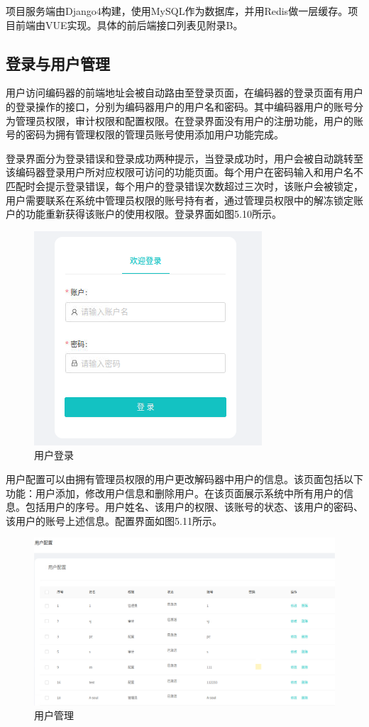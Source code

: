 项目服务端由Django4构建，使用MySQL作为数据库，并用Redis做一层缓存。项目前端由VUE实现。具体的前后端接口列表见附录B。

\subsection{登录与用户管理}

用户访问编码器的前端地址会被自动路由至登录页面，在编码器的登录页面有用户的登录操作的接口，分别为编码器用户的用户名和密码。其中编码器用户的账号分为管理员权限，审计权限和配置权限。在登录界面没有用户的注册功能，用户的账号的密码为拥有管理权限的管理员账号使用添加用户功能完成。

登录界面分为登录错误和登录成功两种提示，当登录成功时，用户会被自动跳转至该编码器登录用户所对应权限可访问的功能页面。每个用户在密码输入和用户名不匹配时会提示登录错误，每个用户的登录错误次数超过三次时，该账户会被锁定，用户需要联系在系统中管理员权限的账号持有者，通过管理员权限中的解冻锁定账户的功能重新获得该账户的使用权限。登录界面如图5.10所示。

\begin{figure}[!htbp]
\centering
\includegraphics[scale=1]{figures/HW/N3.png}
\caption{用户登录}
\end{figure}

用户配置可以由拥有管理员权限的用户更改解码器中用户的信息。该页面包括以下功能：用户添加，修改用户信息和删除用户。在该页面展示系统中所有用户的信息。包括用户的序号。用户姓名、该用户的权限、该账号的状态、该用户的密码、该用户的账号上述信息。配置界面如图5.11所示。

\begin{figure}[!htbp]
\centering
\includegraphics[scale=0.5]{figures/HW/N4.png}
\caption{用户管理}
\end{figure}

